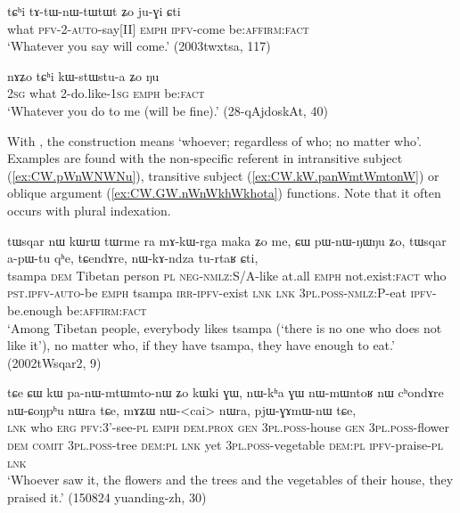 \begin{exe}
\ex \label{ex:tChi.tAtWnWtWtWt}
\gll tɕʰi tɤ-tɯ-nɯ-tɯ\redp{}tɯt ʑo ju-ɣi ɕti \\
what \textsc{pfv}-2-\textsc{auto}-say[II] \textsc{emph} \textsc{ipfv}-come be:\textsc{affirm:fact} \\
\glt  `Whatever you say will come.' (2003twxtsa, 117)
\end{exe}  

\begin{exe}
\ex \label{ex:tChi.kWstWstua}
\gll nɤʑo tɕʰi kɯ-stɯ\redp{}stu-a ʑo ŋu \\
\textsc{2sg} what 2-do.like-\textsc{1sg} \textsc{emph} be:\textsc{fact} \\
\glt `Whatever you do to me (will be fine).' (28-qAjdoskAt, 40)
\end{exe}

With , the construction means `whoever; regardless of who; no matter who'. Examples are found with the non-specific referent in intransitive subject (\ref{ex:CW.pWnWNWNu}), transitive subject (\ref{ex:CW.kW.panWmtWmtonW}) or oblique argument (\ref{ex:CW.GW.nWnWkhWkhota}) functions. Note that it often occurs with plural indexation.

\begin{exe}
\ex \label{ex:CW.pWnWNWNu}
\gll tɯsqar nɯ kɯrɯ tɯrme ra mɤ-kɯ-rga maka ʑo me, ɕɯ pɯ-nɯ-ŋɯ\redp{}ŋu ʑo, tɯsqar a-pɯ-tu qʰe, tɕendɤre, nɯ-kɤ-ndza tu-rtaʁ ɕti, \\
tsampa \textsc{dem} Tibetan person \textsc{pl} \textsc{neg}-\textsc{nmlz}:S/A-like at.all \textsc{emph} not.exist:\textsc{fact} who  \textsc{pst.ipfv-auto}-be \textsc{emph} tsampa \textsc{irr}-\textsc{ipfv}-exist \textsc{lnk} \textsc{lnk} \textsc{3pl.poss}-\textsc{nmlz}:P-eat \textsc{ipfv}-be.enough be:\textsc{affirm}:\textsc{fact} \\
\glt `Among Tibetan people, everybody likes tsampa (`there is no one who does not like it'), no matter who, if they have tsampa, they have enough to eat.' (2002tWsqar2, 9)
\end{exe}

\begin{exe}
\ex \label{ex:CW.kW.panWmtWmtonW}
\gll tɕe ɕɯ kɯ pa-nɯ-mtɯ\redp{}mto-nɯ ʑo kɯki ɣɯ, nɯ-kʰa ɣɯ nɯ-mɯntoʁ nɯ cʰondɤre nɯ-ɕoŋpʰu nɯra tɕe, mɤʑɯ nɯ-<cai> nɯra, pjɯ-ɣɤmɯ-nɯ tɕe, \\
\textsc{lnk} who \textsc{erg} \textsc{pfv}:3'-see-\textsc{pl} \textsc{emph} \textsc{dem.prox} \textsc{gen} \textsc{3pl.poss}-house \textsc{gen} \textsc{3pl.poss}-flower \textsc{dem} \textsc{comit} \textsc{3pl.poss}-tree \textsc{dem:pl} \textsc{lnk} yet \textsc{3pl.poss}-vegetable \textsc{dem:pl} \textsc{ipfv}-praise-\textsc{pl} \textsc{lnk} \\
\glt `Whoever saw it, the flowers and the trees and the vegetables of their house, they praised it.' (150824 yuanding-zh, 30)
\end{exe}

